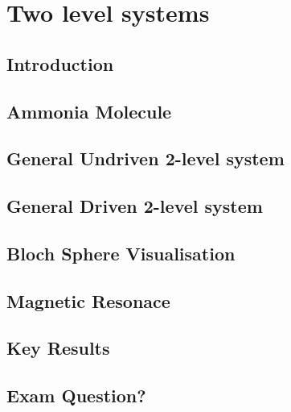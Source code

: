 \chapter{Two level systems}
\label{chapt9}

\section{Introduction}

\section{Ammonia Molecule}

\section{General Undriven 2-level system}

\section{General Driven 2-level system}

\section{Bloch Sphere Visualisation}

\section{Magnetic Resonace}

\section{Key Results}

\section{Exam Question?}